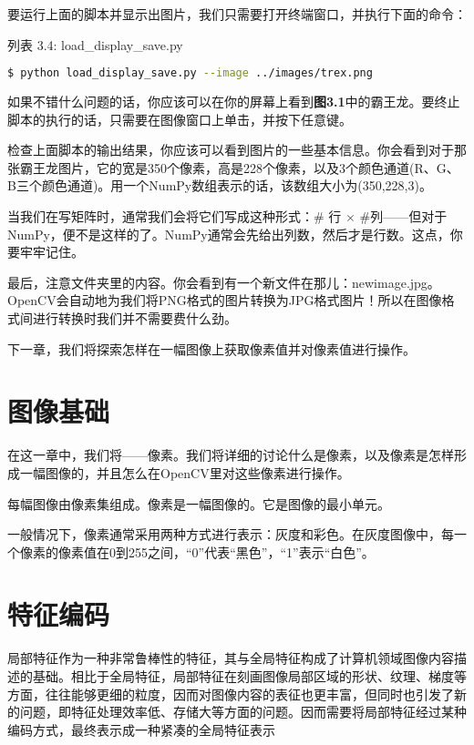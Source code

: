 \documentclass[color=cyan,mathpazo,titlestyle=hang]{elegantbook}
\begin{document}
要运行上面的脚本并显示出图片，我们只需要打开终端窗口，并执行下面的命令：

列表 3.4: load\_display\_save.py

\begin{lstlisting}[language=bash]
$ python load_display_save.py --image ../images/trex.png
\end{lstlisting}

如果不错什么问题的话，你应该可以在你的屏幕上看到\textbf{图3.1}中的霸王龙。要终止脚本的执行的话，只需要在图像窗口上单击，并按下任意键。

检查上面脚本的输出结果，你应该可以看到图片的一些基本信息。你会看到对于那张霸王龙图片，它的宽是350个像素，高是228个像素，以及3个颜色通道(R、G、B三个颜色通道)。用一个NumPy数组表示的话，该数组大小为(350,228,3)。

当我们在写矩阵时，通常我们会将它们写成这种形式：\# 行 $\times$ \#列——但对于NumPy，便不是这样的了。NumPy通常会先给出列数，然后才是行数。这点，你要牢牢记住。

最后，注意文件夹里的内容。你会看到有一个新文件在那儿：newimage.jpg。OpenCV会自动地为我们将PNG格式的图片转换为JPG格式图片！所以在图像格式间进行转换时我们并不需要费什么劲。

下一章，我们将探索怎样在一幅图像上获取像素值并对像素值进行操作。

\chapter{图像基础}

在这一章中，我们将{\color{red}{审查图像的积木}}——像素。我们将详细的讨论什么是像素，以及像素是怎样形成一幅图像的，并且怎么在OpenCV里对这些像素进行操作。

每幅图像由像素集组成。像素是一幅图像的{\color{red}{原材料，积木}}。它是图像的最小单元。

一般情况下，像素通常采用两种方式进行表示：灰度和彩色。在灰度图像中，每一个像素的像素值在0到255之间，“0”代表“黑色”，“1”表示“白色”。

\chapter{特征编码}

局部特征作为一种非常鲁棒性的特征，其与全局特征构成了计算机领域图像内容描述的基础。相比于全局特征，局部特征在刻画图像局部区域的形状、纹理、梯度等方面，往往能够更细的粒度，因而对图像内容的表征也更丰富，但同时也引发了新的问题，即特征处理效率低、存储大等方面的问题。因而需要将局部特征经过某种编码方式，最终表示成一种紧凑的全局特征表示
\end{document}
